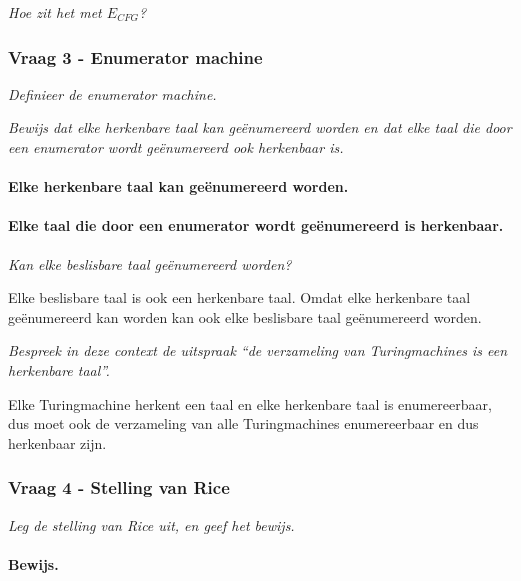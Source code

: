 

\textit{Hoe zit het met $E_{CFG}$?}



\subsubsection{Vraag 3 - Enumerator machine}

\textit{Definieer de enumerator machine.}



\textit{Bewijs dat elke herkenbare taal kan ge\"enumereerd worden en dat elke taal die door een enumerator wordt ge\"enumereerd ook herkenbaar is.}

\paragraph{Elke herkenbare taal kan ge\"enumereerd worden.}


\paragraph{Elke taal die door een enumerator wordt ge\"enumereerd is herkenbaar.}


\textit{Kan elke beslisbare taal ge\"enumereerd worden?}

Elke beslisbare taal is ook een herkenbare taal. Omdat elke herkenbare taal ge\"enumereerd kan worden kan ook elke beslisbare taal ge\"enumereerd worden.

\textit{Bespreek in deze context de uitspraak ``de verzameling van Turingmachines is een herkenbare taal''.}

Elke Turingmachine herkent een taal en elke herkenbare taal is enumereerbaar, dus moet ook de verzameling van alle Turingmachines enumereerbaar en dus herkenbaar zijn.

\subsubsection{Vraag 4 - Stelling van Rice}

\textit{Leg de stelling van Rice uit, en geef het bewijs.}



\paragraph{Bewijs.} 

